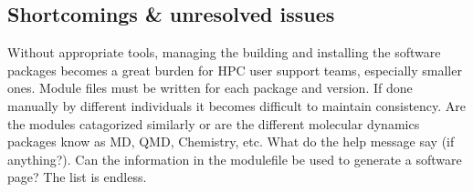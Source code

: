 \label{sec:issues_traditional}
\subsection{Shortcomings \& unresolved issues}

Without appropriate tools, managing the building and installing the software
packages becomes a great burden for HPC user support teams, especially smaller ones.
Module files must be written for each package and version.  If done
manually by different individuals it becomes difficult to maintain
consistency.  Are the modules catagorized similarly or are the
different molecular dynamics packages know as MD, QMD, Chemistry, etc.
What do the help message say (if anything?).  Can the information in
the modulefile be used to generate a software page?  The list is
endless.


